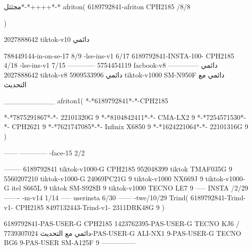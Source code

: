 مجثثل*-*++++*-*
afriton(
6189792841-afriton CPH2185  /8/8

)

2027888642 tiktok-v10
دائمي

788449144-in-on-se-17 8/9
-lse-ins-v1 6/17
6189792841-INSTA-100- CPH2185 4/18
-lse-ins-v1 7/15
------------
5754454119 facbook-v8
دائمي
--------------
2027888642 tiktok-v8
دائمي
5909533996 tiktok-v1000  SM-N950F
دائمي مع التحديث

__________
afriton1(
*-*6189792841*-*-CPH2185

*-*7875291867*-*- 22101320G   9\2
*-*8104842411*-*- CMA-LX2   9\4
*-*7254571530*-*- CPH2621   9\6
*-*7621747085*-*- Infinix X6850   9\6
*-*1624221064*-*- 22101316G   9\9
)


------
------------
-face-15 2/2

--------
6189792841 tiktok-v1000-G CPH2185 
952048399 tiktok TMAF035G 9
5560207210 tiktok-v1000-G 24069PC21G  9 tiktok-v1000 NX669J  9 tiktok-v1000-G  itel S665L  9 tiktok  SM-S928B  9 tiktok-v1000  TECNO LE7  9\9
-----
 INSTA /2/29
-------
-m-v14 1/14
-----
userinsta 6/30
------
-twe/10/29
Trind(
6189792841-Trind-v1- CPH2185 
8497132443-Trind-v1- 2311DRK48G  9\5
)


6189792841-PAS-USER-G CPH2185 
1423762395-PAS-USER-G TECNO KJ6  /دائمي مع التحديث
7739307024-PAS-USER-G  ALI-NX1  9-PAS-USER-G  TECNO BG6  9-PAS-USER  SM-A125F  9\8
    ---------------
